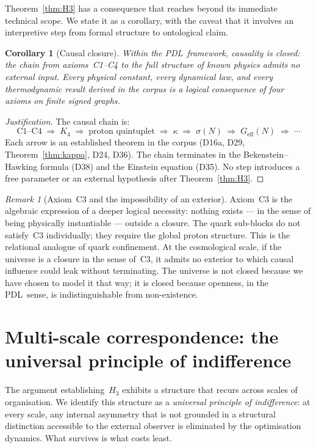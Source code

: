 \documentclass[11pt,a4paper]{article}
\theoremstyle{plain}
\newtheorem{corollary}[theorem]{Corollary}
\theoremstyle{definition}
\theoremstyle{remark}
\newtheorem{remark}[theorem]{Remark}
\newcommand{\PDL}{\textnormal{PDL}}
\newcommand{\Kfour}{K_4}
\newcommand{\kap}{\kappa}
\newcommand{\sigmaN}{\sigma(N)}
\begin{document}
Theorem~\ref{thm:H3} has a consequence that reaches beyond its immediate technical scope. We state it as a corollary, with the caveat that it involves an interpretive step from formal structure to ontological claim.

\begin{corollary}[Causal closure]
\label{cor:causal}
Within the \PDL\ framework, causality is closed: the chain from axioms~C1--C4 to the full structure of known physics admits no external input. Every physical constant, every dynamical law, and every thermodynamic result derived in the corpus is a logical consequence of four axioms on finite signed graphs.
\end{corollary}

\begin{proof}[Justification]
The causal chain is:
\[
\text{C1--C4} \;\Rightarrow\; \Kfour \;\Rightarrow\; \text{proton quintuplet} \;\Rightarrow\; \kap \;\Rightarrow\; \sigmaN \;\Rightarrow\; G_{\mathrm{eff}}(N) \;\Rightarrow\; \cdots
\]
Each arrow is an established theorem in the corpus (D16a, D29, Theorem~\ref{thm:kappa}, D24, D36). The chain terminates in the Bekenstein--Hawking formula (D38) and the Einstein equation (D35). No step introduces a free parameter or an external hypothesis after Theorem~\ref{thm:H3}.
\end{proof}

\begin{remark}[Axiom~C3 and the impossibility of an exterior]
Axiom~C3 is the algebraic expression of a deeper logical necessity: nothing exists --- in the sense of being physically instantiable --- outside a closure. The quark sub-blocks do not satisfy~C3 individually; they require the global proton structure. This is the relational analogue of quark confinement. At the cosmological scale, if the universe is a closure in the sense of~C3, it admits no exterior to which causal influence could leak without terminating. The universe is not closed because we have chosen to model it that way; it is closed because openness, in the \PDL\ sense, is indistinguishable from non-existence.
\end{remark}

\section{Multi-scale correspondence: the universal principle of indifference}
\label{sec:multiscale}

The argument establishing~$H_3$ exhibits a structure that recurs across scales of organisation. We identify this structure as a \emph{universal principle of indifference}: at every scale, any internal asymmetry that is not grounded in a structural distinction accessible to the external observer is eliminated by the optimisation dynamics. What survives is what costs least.
\end{document}
